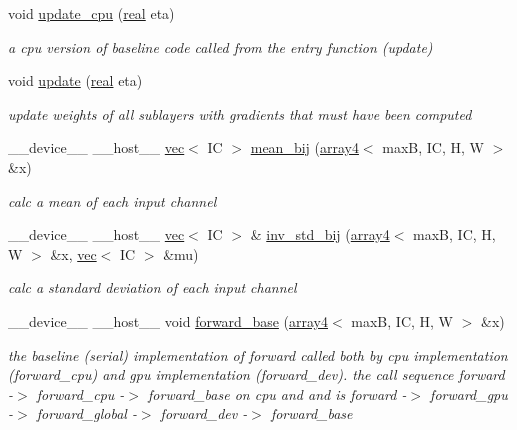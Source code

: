 \begin{DoxyCompactItemize}
void \hyperlink{structBatchNormalization_a223b6369246bad1525c2284a0285c581}{update\+\_\+cpu} (\hyperlink{vgg__util_8h_a1082d08aaa761215ec83e7149f27ad16}{real} eta)
\begin{DoxyCompactList}\small\item\em a cpu version of baseline code called from the entry function (update) \end{DoxyCompactList}\item 
void \hyperlink{structBatchNormalization_a71b4c3d0b5002d84ba2d74f47f7ab8d2}{update} (\hyperlink{vgg__util_8h_a1082d08aaa761215ec83e7149f27ad16}{real} eta)
\begin{DoxyCompactList}\small\item\em update weights of all sublayers with gradients that must have been computed \end{DoxyCompactList}\item 
\+\_\+\+\_\+device\+\_\+\+\_\+ \+\_\+\+\_\+host\+\_\+\+\_\+ \hyperlink{structvec}{vec}$<$ IC $>$ \hyperlink{structBatchNormalization_a0d4c799cedf33dae08d3b46f417c1ecf}{mean\+\_\+bij} (\hyperlink{structarray4}{array4}$<$ maxB, IC, H, W $>$ \&x)
\begin{DoxyCompactList}\small\item\em calc a mean of each input channel \end{DoxyCompactList}\item 
\+\_\+\+\_\+device\+\_\+\+\_\+ \+\_\+\+\_\+host\+\_\+\+\_\+ \hyperlink{structvec}{vec}$<$ IC $>$ \& \hyperlink{structBatchNormalization_a631234804d2a88d43655ab06ea4d5bfc}{inv\+\_\+std\+\_\+bij} (\hyperlink{structarray4}{array4}$<$ maxB, IC, H, W $>$ \&x, \hyperlink{structvec}{vec}$<$ IC $>$ \&mu)
\begin{DoxyCompactList}\small\item\em calc a standard deviation of each input channel \end{DoxyCompactList}\item 
\+\_\+\+\_\+device\+\_\+\+\_\+ \+\_\+\+\_\+host\+\_\+\+\_\+ void \hyperlink{structBatchNormalization_a95b82689b898e3e9940a98a0145eb6ca}{forward\+\_\+base} (\hyperlink{structarray4}{array4}$<$ maxB, IC, H, W $>$ \&x)
\begin{DoxyCompactList}\small\item\em the baseline (serial) implementation of forward called both by cpu implementation (forward\+\_\+cpu) and gpu implementation (forward\+\_\+dev). the call sequence forward -\/$>$ forward\+\_\+cpu -\/$>$ forward\+\_\+base on cpu and and is forward -\/$>$ forward\+\_\+gpu -\/$>$ forward\+\_\+global -\/$>$ forward\+\_\+dev -\/$>$ forward\+\_\+base \end{DoxyCompactList}\item 

\end{DoxyCompactItemize}
